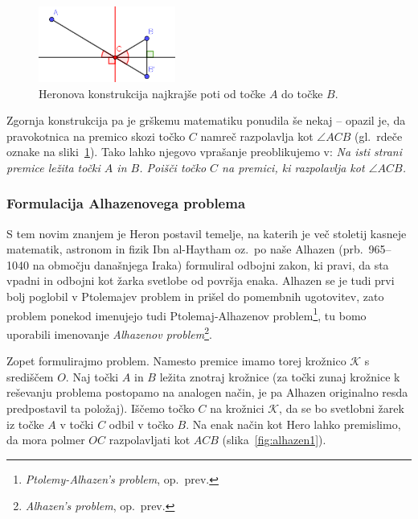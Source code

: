 \begin{figure}[h]
    \centering
    \includegraphics[width=0.4\textwidth]{images/alhazen/heron.png}
    \caption[Heronovo vprašanje]{Heronova konstrukcija najkrajše poti od točke $A$ do točke $B$.}
    \label{fig:heron}
\end{figure}

Zgornja konstrukcija pa je grškemu matematiku ponudila še nekaj -- opazil je, da pravokotnica na premico skozi točko $C$ namreč razpolavlja kot $\angle ACB$ (gl.\ rdeče oznake na sliki~\ref{fig:heron}). Tako lahko njegovo vprašanje preoblikujemo v: \emph{Na isti strani premice ležita točki $A$ in $B$. Poišči točko $C$ na premici, ki razpolavlja kot $\angle ACB$.}


\subsubsection*{Formulacija Alhazenovega problema}

S tem novim znanjem je Heron postavil temelje, na katerih je več stoletij kasneje matematik, astronom in fizik Ibn al-Haytham oz.\ po naše Alhazen (prb.\ 965--1040 na območju današnjega Iraka) formuliral odbojni zakon, ki pravi, da sta vpadni in odbojni kot žarka svetlobe od površja enaka. Alhazen se je tudi prvi bolj poglobil v Ptolemajev problem in prišel do pomembnih ugotovitev, zato problem ponekod imenujejo tudi Ptolemaj-Alhazenov problem\footnote{\emph{Ptolemy-Alhazen's problem}, op.\ prev.}, tu bomo uporabili imenovanje \emph{Alhazenov problem}\footnote{\emph{Alhazen's problem}, op.\ prev.}. 

Zopet formulirajmo problem. Namesto premice imamo torej krožnico $\mathcal{K}$ s središčem $O$. Naj točki $A$ in $B$ ležita znotraj krožnice (za točki zunaj krožnice k reševanju problema postopamo na analogen način, je pa Alhazen originalno resda predpostavil ta položaj). Iščemo točko $C$ na krožnici $\mathcal{K}$, da se bo svetlobni žarek iz točke $A$ v točki $C$ odbil v točko $B$. Na enak način kot Hero lahko premislimo, da mora polmer $OC$ razpolavljati kot $ACB$ (slika~\ref{fig:alhazen1}).

